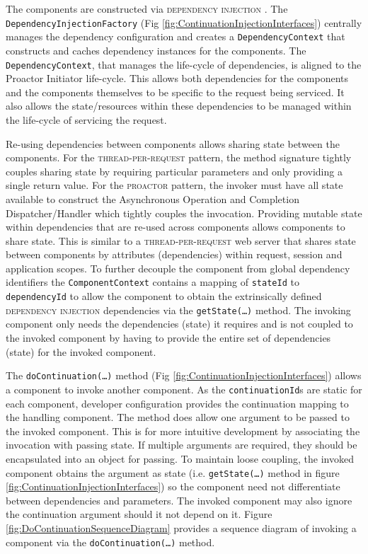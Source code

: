 \documentclass[prodmode]{style/acmlarge}
\begin{document}
The components are constructed via \textsc{dependency injection} \cite{ioc}.
The \texttt{Dependency\-InjectionFactory} (Fig
\ref{fig:ContinuationInjectionInterfaces}) centrally manages the dependency
configuration and creates a \texttt{DependencyContext} that constructs and
caches dependency instances for the components.  The \texttt{DependencyContext},
that manages the life-cycle of dependencies, is aligned to the Proactor
Initiator life-cycle.  This allows both dependencies for the components and the
components themselves to be specific to the request being serviced.  It also
allows the state/resources within these dependencies to be managed within the
life-cycle of servicing the request.

Re-using dependencies between components allows sharing state between the
components.  For the \textsc{thread-per-request} pattern, the method signature
tightly couples sharing state by requiring particular parameters and only
providing a single return value.  For the \textsc{proactor} pattern, the invoker
must have all state available to construct the Asynchronous Operation and
Completion Dispatcher/Handler which tightly couples the invocation.  Providing
mutable state within dependencies that are re-used across components allows
components to share state.  This is similar to a \textsc{thread-per-request} web
server that shares state between components by attributes (dependencies) within
request, session and application scopes.  To further decouple the component from
global dependency identifiers the \texttt{ComponentContext} contains a mapping
of \texttt{stateId} to \texttt{dependencyId} to allow the component to obtain
the extrinsically defined \textsc{dependency injection} dependencies via the
\texttt{getState(\ldots)} method.  The invoking component only needs the
dependencies (state) it requires and is not coupled to the invoked component by
having to provide the entire set of dependencies (state) for the invoked
component.

The \texttt{doContinuation(\ldots)} method (Fig
\ref{fig:ContinuationInjectionInterfaces}) allows a component to invoke another
component.  As the \texttt{continu\-ationId}s are static for each component,
developer configuration provides the continuation mapping to the handling
component.  The method does allow one argument to be passed to the invoked
component.  This is for more intuitive development by associating the invocation
with passing state.  If multiple arguments are required, they should be
encapsulated into an object for passing.  To maintain loose coupling, the
invoked component obtains the argument as state (i.e. \texttt{getState(\ldots)}
method in figure \ref{fig:ContinuationInjectionInterfaces}) so the component
need not differentiate between dependencies and parameters.  The invoked
component may also ignore the continuation argument should it not depend on it. 
Figure \ref{fig:DoContinuationSequenceDiagram} provides a sequence diagram of
invoking a component via the \texttt{doContinuation(\ldots)} method.
  
\end{document}
